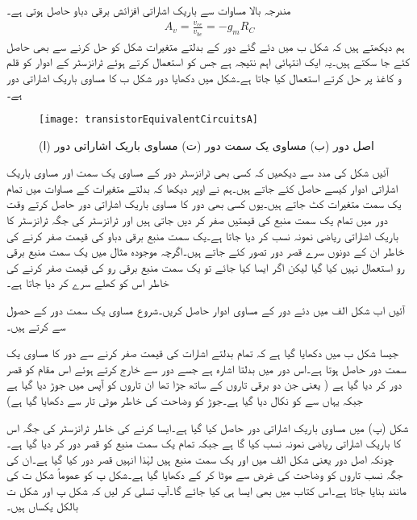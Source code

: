 مندرجہ بالا مساوات سے باریک اشاراتی افزائش برقی دباو  حاصل ہوتی ہے۔
\begin{align}
A_v=\frac{v_{ce}}{v_{be}}=-g_m R_C
\end{align}
ہم دیکھتے ہیں کہ شکل  ب میں دئے گئے دور کے بدلتے متغیرات شکل   کو حل کرنے سے بھی حاصل کئے جا سکتے ہیں۔یہ ایک انتہائی اہم نتیجہ ہے جس کو استعمال کرتے ہوئے ٹرانزسٹر کے ادوار کو قلم و کاغذ پر حل کرتے استعمال کیا جاتا ہے۔شکل   میں دکھایا دور شکل  ب کا مساوی باریک اشاراتی دور ہے۔

\begin{figure}
\centering
\texttt{[image: transistorEquivalentCircuitsA]}
\caption{(ا) اصل دور (ب) مساوی یک سمت دور (ت) مساوی باریک اشاراتی دور}
\label{شکل_مساوی_دور_الف}
\end{figure}
آئیں شکل   کی مدد سے دیکھیں کہ کسی بھی ٹرانزسٹر دور کے مساوی یک سمت اور مساوی باریک اشاراتی ادوار کیسے حاصل کئے جاتے ہیں۔ہم نے اوپر دیکھا کہ بدلتے متغیرات کے مساوات میں تمام یک سمت متغیرات کٹ جاتے ہیں۔یوں کسی بھی دور کا مساوی باریک اشاراتی دور حاصل کرتے وقت دور میں تمام یک سمت منبع کی قیمتیں صفر کر دیں جاتی ہیں اور ٹرانزسٹر کی جگہ ٹرانزسٹر کا باریک اشاراتی ریاضی نمونہ  نسب کر دیا جاتا ہے۔یک سمت منبع برقی دباو کی قیمت صفر کرنے کی خاطر ان کے دونوں سرے قصر دور تصور کئے جاتے ہیں۔اگرچہ موجودہ مثال میں یک سمت منبع برقی رو استعمال نہیں کیا گیا لیکن اگر ایسا کیا جائے تو یک سمت منبع برقی رو کی قیمت صفر کرنے کی خاطر اس کو کھلے سرے کر دیا جاتا ہے۔

آئیں اب شکل  الف میں دئے دور کے مساوی ادوار حاصل کریں۔شروع مساوی یک سمت دور کے حصول سے کرتے ہیں۔
	

جیسا شکل  ب میں دکھایا گیا ہے کہ تمام بدلتے اشارات کی قیمت صفر کرنے سے  دور کا مساوی یک سمت دور حاصل ہوتا ہے۔اس دور میں  بدلتا اشارہ ہے جسے دور سے خارج کرتے ہوئے اس مقام کو قصر دور کر دیا گیا ہے ( یعنی جن دو برقی تاروں کے ساتھ  جڑا تھا ان تاروں کو آپس میں جوڑ دیا گیا ہے جبکہ یہاں سے  کو نکال دیا گیا ہے۔جوڑ کو وضاحت کی خاطر موٹی تار سے دکھایا گیا ہے)

شکل (پ) میں مساوی باریک اشاراتی دور حاصل کیا گیا ہے۔ایسا کرنے کی خاطر ٹرانزسٹر کی جگہ اس کا باریک اشاراتی  ریاضی نمونہ   نسب کیا گا ہے جبکہ تمام یک سمت منبع کو قصر دور کر دیا گیا ہے۔چونکہ اصل دور یعنی شکل  الف   میں  اور  یک سمت منبع ہیں لہٰذا انہیں قصر دور کیا گیا ہے۔ان کی جگہ نسب تاروں کو وضاحت کی غرض سے موٹا کر کے دکھایا گیا ہے۔شکل  پ کو عموماً شکل  ت کی مانند بنایا جاتا ہے۔اس کتاب میں بھی  ایسا ہی کیا جائے گا۔آپ تسلی کر لیں کہ شکل  پ اور شکل  ت بالکل یکساں ہیں۔

